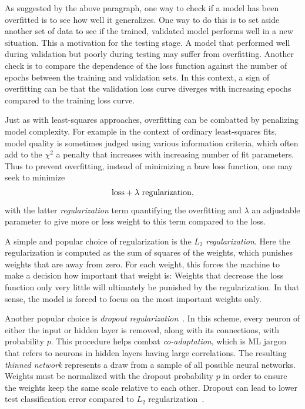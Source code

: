 As suggested by the above paragraph, one way to check if a model has been
overfitted is to see how well it generalizes. One way to do this is to set aside
another set of data to see if the trained, validated model performs well in a
new situation. This a motivation for the testing stage. A model that performed
well during validation but poorly during testing may suffer from overfitting.
Another check is to compare the dependence of the loss function against the
number of epochs between the training and validation sets. In this context, a
sign of overfitting can be that the validation loss curve diverges with increasing 
epochs compared to the training loss curve.

Just as with least-squares approaches, overfitting can be combatted by
penalizing model complexity. For example in the context of ordinary
least-squares fits, model quality is sometimes judged using various information
criteria, which often add to the $\chi^2$ a penalty that increases with
increasing number of fit parameters. Thus to prevent overfitting, instead of
minimizing a bare loss function, one may seek to minimize
\begin{equation}
{\rm loss}+\lambda~{\rm regularization},
\end{equation}
with the latter {\it regularization} term quantifying the
overfitting and $\lambda$ an adjustable parameter to give more or less weight to
this term compared to the loss.

A simple and popular choice of regularization is the $L_2$ 
{\it regularization}. Here the regularization is computed as
the sum of squares of the weights, which punishes weights that are away from
zero. For each weight, this forces the machine to make a decision how important
that weight is: Weights that decrease the loss function only very little will
ultimately be punished by the regularization. In that sense, the model is forced
to focus on the most important weights only.

Another popular choice is {\it dropout
regularization}~\cite{srivastava_dropout_2014}. In this scheme, every neuron of
either the input or hidden layer is removed, along with its connections, with
probability $p$. This procedure helps combat {\it
co-adaptation}, which is ML jargon that refers to neurons
in hidden layers having large correlations. The 
resulting {\it thinned network}
represents a draw from a sample of all possible neural networks. Weights must be
normalized with the dropout probability $p$ in order to ensure the weights keep
the same scale relative to each other. Dropout can lead to lower test classification 
error compared to $L_2$ regularization~\cite{srivastava_dropout_2014}.




